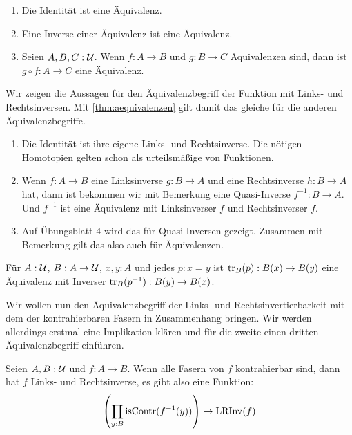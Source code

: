 \begin{bemerkung}
  \begin{enumerate}
  \item Die Identität ist eine Äquivalenz.
  \item Eine Inverse einer Äquivalenz ist eine Äquivalenz.
  \item Seien $A,B,C:\mathcal{U}$. Wenn $f:A\to B$ und $g:B\to C$ Äquivalenzen sind, dann ist $g\circ f:A\to C$ eine Äquivalenz.
  \end{enumerate}
\end{bemerkung}
\begin{beweis}
  Wir zeigen die Aussagen für den Äquivalenzbegriff der Funktion mit Links- und Rechtsinversen.
  Mit \cref{thm:aequivalenzen} gilt damit das gleiche für die anderen Äquivalenzbegriffe.
  \begin{enumerate}
  \item Die Identität ist ihre eigene Links- und Rechtsinverse. Die nötigen Homotopien gelten schon als urteilsmäßige von Funktionen.
  \item Wenn $f:A\to B$ eine Linksinverse $g:B\to A$ und eine Rechtsinverse $h:B\to A$ hat, dann ist bekommen wir mit Bemerkung  eine Quasi-Inverse $f^{-1}:B\to A$.
    Und $f^{-1}$ ist eine Äquivalenz mit Linksinverser $f$ und Rechtsinverser $f$.
  \item Auf Übungsblatt 4 wird das für Quasi-Inversen gezeigt. Zusammen mit Bemerkung  gilt das also auch für Äquivalenzen.
  \end{enumerate}
\end{beweis}

\begin{beispiel}
  \label{bsp:transp-aequiv}
  Für $A:\mathcal{U}$, $B:A\to\mathcal{U}$, $x,y:A$ und jedes $p:x=y$ ist $\mathrm{tr}_B(p):B(x)\to B(y)$ eine Äquivalenz mit Inverser $\mathrm{tr}_B(p^{-1}):B(y)\to B(x)$.
\end{beispiel}

Wir wollen nun den Äquivalenzbegriff der Links- und Rechtsinvertierbarkeit mit dem der kontrahierbaren Fasern in Zusammenhang bringen.
Wir werden allerdings erstmal eine Implikation klären und für die zweite einen dritten Äquivalenzbegriff einführen.

\begin{bemerkung}
  \label{bem:isContr-lrinv}
  Seien $A,B:\mathcal{U}$ und $f:A\to B$. Wenn alle Fasern von $f$ kontrahierbar sind, dann hat $f$ Links- und Rechtsinverse, es gibt also eine Funktion:
  \[
    \left(\prod_{y:B}\mathrm{isContr}(f^{-1}(y))\right) \to \mathrm{LRInv}(f)
  \]
\end{bemerkung}

